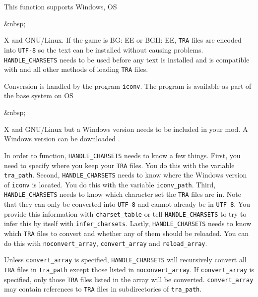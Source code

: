 \documentclass{article}
\def\ttref#1{\ahrefloc{#1}{\tt #1}}
\def\t#1{{\tt #1}}
\begin{document}
This function supports Windows, OS\begin{rawhtml}&nbsp;\end{rawhtml}X and GNU/Linux. If the game is BG: EE or BGII: EE, \t{TRA} files are encoded into \t{UTF-8} so the text can be installed without causing problems. \verb+HANDLE_CHARSETS+ needs to be used before any text is installed and is compatible with \ttref{AUTO!TRA} and all other methods of loading \t{TRA} files.

Conversion is handled by the program \t{iconv}. The program is available as part of the base system on OS\begin{rawhtml}&nbsp;\end{rawhtml}X and GNU/Linux but a Windows version needs to be included in your mod. A Windows version can be downloaded .

In order to function, \verb+HANDLE_CHARSETS+ needs to know a few things. First, you need to specify where you keep your \t{TRA} files. You do this with the variable \verb+tra_path+. Second, \verb+HANDLE_CHARSETS+ needs to know where the Windows version of \t{iconv} is located. You do this with the variable \verb+iconv_path+. Third, \verb+HANDLE_CHARSETS+ needs to know which character set the \t{TRA} files are in. Note that they can only be converted into \t{UTF-8} and cannot already be in \t{UTF-8}. You provide this information with \verb+charset_table+ or tell \verb+HANDLE_CHARSETS+ to try to infer this by itself with \verb+infer_charsets+. Lastly, \verb+HANDLE_CHARSETS+ needs to know which \t{TRA} files to convert and whether any of them should be reloaded. You can do this with \verb+noconvert_array+, \verb+convert_array+ and \verb+reload_array+.

Unless \verb+convert_array+ is specified, \verb+HANDLE_CHARSETS+ will recursively convert all \t{TRA} files in \verb+tra_path+ except those listed in \verb+noconvert_array+. If \verb+convert_array+ is specified, only those \t{TRA} files listed in the array will be converted. \verb+convert_array+ may contain references to \t{TRA} files in subdirectories of \verb+tra_path+.
\end{document}
